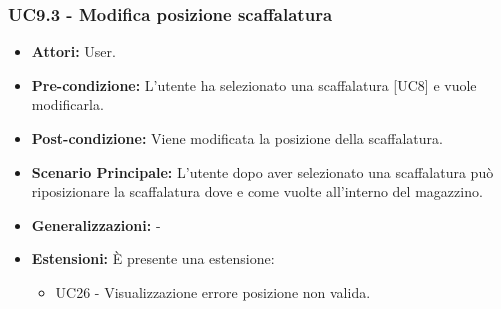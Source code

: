 \subsubsection{UC9.3 - Modifica posizione scaffalatura}
\begin{itemize}
    \item \textbf{Attori:} User.
    \item \textbf{Pre-condizione:} L'utente ha selezionato una scaffalatura [UC8] e vuole modificarla.
    \item \textbf{Post-condizione:} Viene modificata la posizione della scaffalatura.
    \item \textbf{Scenario Principale:} L'utente dopo aver selezionato una scaffalatura può riposizionare la scaffalatura dove e come vuolte all'interno del magazzino.
    \item \textbf{Generalizzazioni:} -
    \item \textbf{Estensioni:} È presente una estensione:
    \begin{itemize}
        \item UC26 - Visualizzazione errore posizione non valida.
    \end{itemize}
\end{itemize}